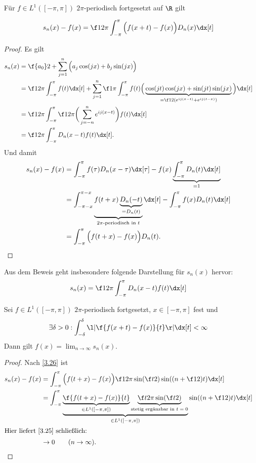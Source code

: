 \begin{lem} \label{3.26}
	Für $f \in L^1([-\pi, \pi])$ $2\pi$-periodisch fortgesetzt auf $\R$ gilt

	\begin{align*}
		s_n(x) - f(x) = \f 1{2\pi}\int_{-\pi}^{\pi} \Big(f(x+t) - f(x)\Big) D_n(x) \dx[t]
	\end{align*}
	\begin{proof}
		Es gilt 
		\begin{align*}
			s_n(x) 
			&= \f {a_0}2 + \sum_{j=1}^n \Big( a_j \cos(jx) + b_j \sin(jx) \Big) \\
			&= \f 1{2 \pi} \int_{-\pi}^{\pi} f(t) \dx[t] + \sum_{j=1}^n \f 1{\pi} \int_{-\pi}^{\pi} f(t) \Big( \underbrace{\cos(jt) \cos(jx) + \sin(jt) \sin(jx)}_{= \f 12 ( e^{ij(x-t)} + e^{ij(t-x)})} \Big) \dx[t] \\
			&= \f 1{2\pi} \int_{-\pi}^{\pi} \f 1{2\pi} \bigg( \sum_{j=-n}^n e^{ij(x-t)} \bigg) f(t) \dx[t] \\
			&= \f 1{2\pi} \int_{-\pi}^{\pi} D_n(x-t) f(t) \dx[t].
		\end{align*}
		Und damit
		\begin{align*}
			s_n(x) - f(x) 
			&= \int_{-\pi}^{\pi} f(\tau) D_n(x-\tau) \dx[\tau] - f(x) \underbrace{\int_{-\pi}^{\pi} D_n(t) \dx[t]}_{=1} \\
			&= \int_{-\pi-x}^{\pi-x} \underbrace{f(t + x)\underbrace{D_n(-t)}_{=D_n(t)}}_{\text{$2\pi$-periodisch in $t$}} \dx[t] - \int_{-\pi}^\pi f(x) D_n(t) \dx[t] \\
			&= \int_{-\pi}^{\pi} \Big( f(t + x) - f(x) \Big) D_n(t).
		\end{align*}
	\end{proof}
	\begin{note}
		Aus dem Beweis geht insbesondere folgende Darstellung für $s_n(x)$ hervor:
		\begin{align*}
			s_n(x) = \f 1{2\pi} \int_{-\pi}^{\pi} D_n(x-t) f(t) \dx[t]
		\end{align*}
	\end{note}
\end{lem}

\begin{st} \label{3.27}
	Sei $f \in L^1([-\pi,\pi])$ $2\pi$-periodisch fortgesetzt, $x \in [-\pi,\pi]$ fest und
	\[
		\exists \delta > 0 : \int_{-\delta}^{\delta} \l| \f{f(x+t)-f(x)}{t} \r| \dx[t] < \infty
	\]
	Dann gilt $f(x) = \lim_{n\to\infty} s_n(x)$.
	\begin{proof}
		Nach \ref{3.26} ist
		\begin{align*}
			s_n(x)-f(x)
			&= \int_{-\pi}^\pi \Big( f(t+x)-f(x) \Big) \f 1{2\pi \sin(\f t2)} \sin((n+\f 12) t) \dx[t] \\
			&= \int_{-\pi}^\pi \underbrace{\underbrace{\f {f(t+x)-f(x)}{t}}_{\in L^1([-\pi,\pi])} \underbrace{\f t{2\pi \sin(\f t2)}}_{\text{stetig ergänzbar in $t=0$}}}_{\in L^1([-\pi,\pi])} \sin((n+\f 12) t) \dx[t] \\
			\intertext{Hier liefert \ref{3.25} schließlich:}
			&\to 0 \qquad (n\to \infty).
		\end{align*}
	\end{proof}
\end{st}

